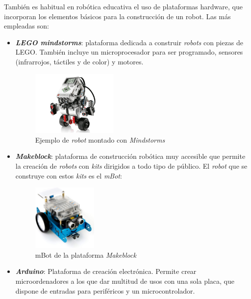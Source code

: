 También es habitual en robótica educativa el uso de plataformas hardware, que incorporan los elementos básicos para la construcción de un robot. Las más empleadas son:
\begin{itemize}
    \item \textit{\textbf{LEGO mindstorms}}: plataforma dedicada a construir \textit{robots} con piezas de LEGO. También incluye un microprocesador para ser programado, sensores (infrarrojos, táctiles y de color) y motores.
            \begin{figure}[H]
        \centering
        \includegraphics[width=0.4\textwidth]{img/legomind.jpg}
        \caption{Ejemplo de \textit{robot} montado con \textit{Mindstorms}} \label{fig:lego}
    \end{figure}
    \item \textit{\textbf{Makeblock}}\cite{bib:makeblock}: plataforma de construcción robótica muy accesible que permite la creación de \textit{robots} con \textit{kits} dirigidos a todo tipo de público. El \textit{robot} que se construye con estos \textit{kits} es el \textit{mBot}:
        \begin{figure}[H]
        \centering
        \includegraphics[width=0.3\textwidth]{img/mBotReal.jpg}
        \caption{mBot de la plataforma \textit{Makeblock}} \label{fig:makeblock}
    \end{figure}

    \item \textit{\textbf{Arduino}}\cite{bib:arduino}: Plataforma de creación electrónica. Permite crear microordenadores a los que dar multitud de usos con una sola placa, que dispone de entradas para periféricos y un microcontrolador.

\end{itemize}{}
